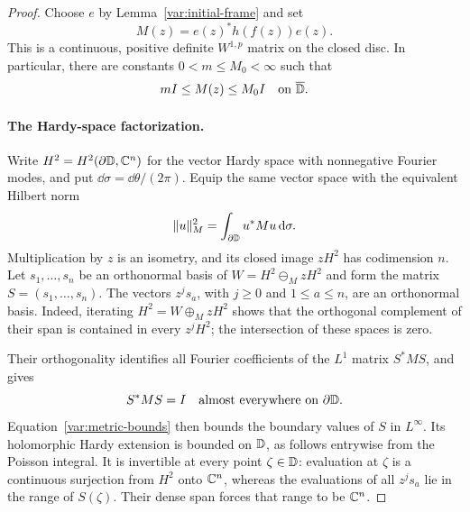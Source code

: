 \begin{proof}
Choose $e$ by Lemma~\ref{var:initial-frame} and set
\[
 M(z)=e(z)^*h(f(z))e(z).
\]
This is a continuous, positive definite $W^{1,p}$ matrix on the closed
disc.  In particular, there are constants $0<m\le M_0<\infty$ such
that
\begin{equation}\label{var:metric-bounds}
 mI\le M(z)\le M_0I
 \quad\hbox{on }\overline{\mathbb D}.
\end{equation}

\paragraph{The Hardy-space factorization.}
Write $H^2=H^2(\partial\mathbb D,\mathbb C^n)$ for the vector Hardy space with
nonnegative Fourier modes, and put $\dd\sigma=\dd\theta/(2\pi)$.
Equip the same vector space with the equivalent Hilbert norm
\[
 \|u\|_M^2=\int_{\partial\mathbb D}u^*Mu\,\mathrm d\sigma.
\]
Multiplication by $z$ is an isometry, and its closed image $zH^2$ has
codimension $n$.  Let $s_1,\ldots,s_n$ be an orthonormal basis of
$W=H^2\ominus_M zH^2$ and form the matrix $S=(s_1,\ldots,s_n)$.
The vectors $z^j s_a$, with $j\ge0$ and $1\le a\le n$, are an
orthonormal basis.  Indeed, iterating
$H^2=W\oplus_M zH^2$ shows that the orthogonal complement of their
span is contained in every $z^jH^2$; the intersection of these spaces
is zero.

Their orthogonality identifies all Fourier coefficients of the
$L^1$ matrix $S^*MS$, and gives
\begin{equation}\label{var:hardy-factor}
 S^*MS=I\quad\hbox{almost everywhere on }\partial\mathbb D.
\end{equation}
Equation~\eqref{var:metric-bounds} then bounds the boundary values of
$S$ in $L^\infty$.  Its holomorphic Hardy extension is bounded on
$\mathbb D$, as follows entrywise from the Poisson integral.  It is invertible
at every point $\zeta\in\mathbb D$: evaluation at $\zeta$ is a continuous
surjection from $H^2$ onto $\mathbb C^n$, whereas the evaluations of all
$z^j s_a$ lie in the range of $S(\zeta)$.  Their dense span forces
that range to be $\mathbb C^n$.


\end{proof}
